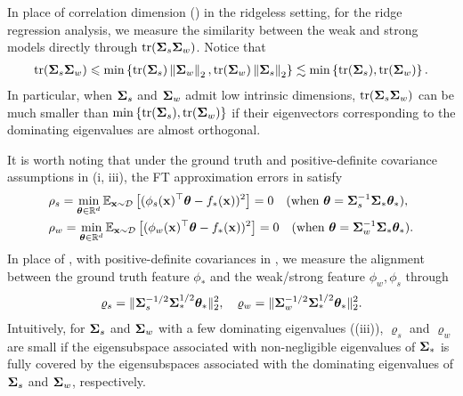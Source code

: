 \begin{remark}
    In place of correlation dimension () in the ridgeless setting, for the ridge regression analysis, we measure the similarity between the weak and strong models directly through $\mathop{\mathrm{tr}}(\boldsymbol{\Sigma}_s \boldsymbol{\Sigma}_w)$. Notice that 
    \begin{align*}
        \mathop{\mathrm{tr}}(\boldsymbol{\Sigma}_s \boldsymbol{\Sigma}_w) \leqslant \min\left\{\mathop{\mathrm{tr}}(\boldsymbol{\Sigma}_s)\left\|\boldsymbol{\Sigma}_w\right\|_2, \mathop{\mathrm{tr}}(\boldsymbol{\Sigma}_w)\left\|\boldsymbol{\Sigma}_s\right\|_2\right\} \lesssim \min\left\{\mathop{\mathrm{tr}}(\boldsymbol{\Sigma}_s), \mathop{\mathrm{tr}}(\boldsymbol{\Sigma}_w)\right\}.
    \end{align*}
    In particular, when $\boldsymbol{\Sigma}_s$ and $\boldsymbol{\Sigma}_w$ admit low intrinsic dimensions, $\mathop{\mathrm{tr}}(\boldsymbol{\Sigma}_s \boldsymbol{\Sigma}_w)$ can be much smaller than $\min\left\{\mathop{\mathrm{tr}}(\boldsymbol{\Sigma}_s), \mathop{\mathrm{tr}}(\boldsymbol{\Sigma}_w)\right\}$ if their eigenvectors corresponding to the dominating eigenvalues are almost orthogonal.
\end{remark}

\begin{remark}
    It is worth noting that under the ground truth and positive-definite covariance assumptions in (i, iii), the FT approximation errors in  satisfy
    \begin{align}\label{eq:pf_ridge_ft_approx_err}
    \begin{split}
        &\rho_s = \min_{\boldsymbol{\theta} \in \mathbb{R}^d} \mathbb{E}_{\mathbf{x} \sim \mathcal{D}}\left[(\phi_s(\mathbf{x})^\top \boldsymbol{\theta} - f_*(\mathbf{x}))^2\right] = 0 \quad (\text{when } \boldsymbol{\theta} = \boldsymbol{\Sigma}_s^{-1} \boldsymbol{\Sigma}_* \boldsymbol{\theta}_*), \\
        &\rho_w = \min_{\boldsymbol{\theta} \in \mathbb{R}^d} \mathbb{E}_{\mathbf{x} \sim \mathcal{D}}\left[(\phi_w(\mathbf{x})^\top \boldsymbol{\theta} - f_*(\mathbf{x}))^2\right] = 0 \quad (\text{when } \boldsymbol{\theta} = \boldsymbol{\Sigma}_w^{-1} \boldsymbol{\Sigma}_* \boldsymbol{\theta}_*).
    \end{split}
    \end{align}
    In place of , with positive-definite covariances in , we measure the alignment between the ground truth feature $\phi_*$ and the weak/strong feature $\phi_w, \phi_s$ through
    \begin{align*}
        \varrho_s = \|\boldsymbol{\Sigma}_s^{-1/2} \boldsymbol{\Sigma}_*^{1/2} \boldsymbol{\theta}_*\|_2^2, \quad \varrho_w = \|\boldsymbol{\Sigma}_w^{-1/2} \boldsymbol{\Sigma}_*^{1/2} \boldsymbol{\theta}_*\|_2^2.
    \end{align*}
    Intuitively, for $\boldsymbol{\Sigma}_s$ and $\boldsymbol{\Sigma}_w$ with a few dominating eigenvalues ((iii)), $\varrho_s$ and $\varrho_w$ are small if the eigensubspace associated with non-negligible eigenvalues of $\boldsymbol{\Sigma}_*$ is fully covered by the eigensubspaces associated with the dominating eigenvalues of $\boldsymbol{\Sigma}_s$ and $\boldsymbol{\Sigma}_w$, respectively. 
\end{remark}


